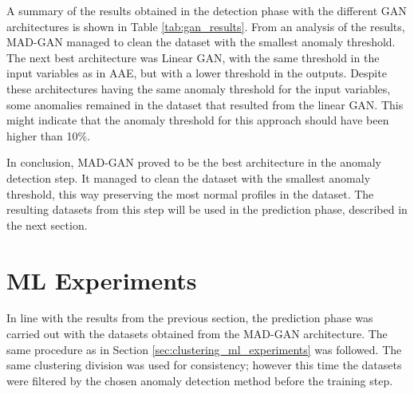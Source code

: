 A summary of the results obtained in the detection phase with the different GAN architectures is shown in Table \ref{tab:gan_results}. From an analysis of the results, MAD-GAN managed to clean the dataset with the smallest anomaly threshold. The next best architecture was Linear GAN, with the same threshold in the input variables as in AAE, but with a lower threshold in the outputs. Despite these architectures having the same anomaly threshold for the input variables, some anomalies remained in the dataset that resulted from the linear GAN. This might indicate that the anomaly threshold for this approach should have been higher than 10\%.

In conclusion, MAD-GAN proved to be the best architecture in the anomaly detection step. It managed to clean the dataset with the smallest anomaly threshold, this way preserving the most normal profiles in the dataset. The resulting datasets from this step will be used in the prediction phase, described in the next section.


\section{ML Experiments}\label{ml_experiments}
In line with the results from the previous section, the prediction phase was carried out with the datasets obtained from the MAD-GAN architecture. The same procedure as in Section \ref{sec:clustering_ml_experiments} was followed. The same clustering division was used for consistency; however this time the datasets were filtered by the chosen anomaly detection method before the training step. 

